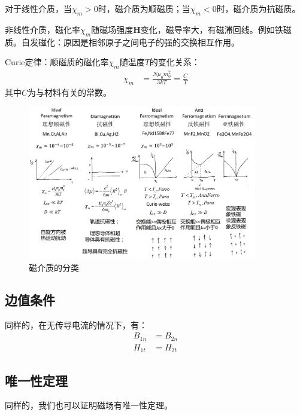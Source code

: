 \documentclass[12pt,onecolumn,a4paper]{book}
\numberwithin{table}{subsection}
\numberwithin{equation}{subsection}
\begin{document}
    对于线性介质，当$\chi_m>0$时，磁介质为顺磁质；当$\chi_m<0$时，磁介质为抗磁质。

    非线性介质，磁化率$\chi_m$随磁场强度$\mathbf{H}$变化，磁导率大，有磁滞回线。例如铁磁质。自发磁化：原因是相邻原子之间电子的强的交换相互作用。

    Curie定律：顺磁质的磁化率$\chi_m$随温度$T$的变化关系：
    \begin{align}
        \chi_m & = \frac{N\mu_0m_0^2}{3kT} = \frac{C}{T}
    \end{align}
    其中$C$为与材料有关的常数。

    \begin{figure}[ht]
        \centering
        \includegraphics[width=10cm]{pic/6.2.2.png}
        \caption{磁介质的分类}
    \end{figure}

    \subsection{边值条件}

    同样的，在无传导电流的情况下，有：
    \begin{align}
        B_{1n} & =  B_{2n} \\
        H_{1t} & =  H_{2t}
    \end{align}

    \subsection{唯一性定理}

    同样的，我们也可以证明磁场有唯一性定理。
\end{document}
